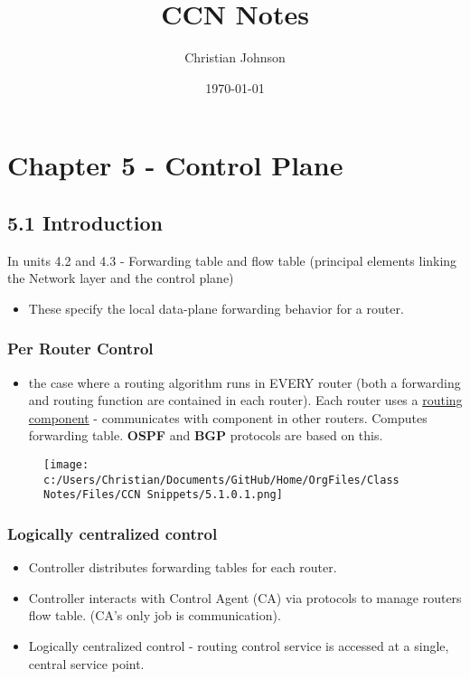 \documentclass[11pt]{article}
\author{Christian Johnson}
\date{\today}
\title{CCN Notes}
\begin{document}
\maketitle
\tableofcontents




\section{Chapter 5 - Control Plane}
\label{sec:org54bc6a9}

\subsection{5.1 Introduction}
\label{sec:org86b6012}

In units 4.2 and 4.3 - Forwarding table and flow table (principal elements linking the Network layer and the control plane)
\begin{itemize}
\item These specify the local data-plane forwarding behavior for a router.
\end{itemize}

\subsubsection{Per Router Control}
\label{sec:org54326b7}
\begin{itemize}
\item the case where a routing algorithm runs in EVERY router (both a forwarding and routing function are contained in each router). Each router uses a \uline{routing component} - communicates with component in other routers. Computes forwarding table. \textbf{OSPF} and \textbf{BGP} protocols are based on this.
\end{itemize}

\begin{figure}[htbp]
\centering
\texttt{[image: c:/Users/Christian/Documents/GitHub/Home/OrgFiles/Class Notes/Files/CCN Snippets/5.1.0.1.png]}
\end{figure}

\subsubsection{Logically centralized control}
\label{sec:orgc38aff5}
\begin{itemize}
\item Controller distributes forwarding tables for each router.
\item Controller interacts with Control Agent (CA) via protocols to manage routers flow table. (CA's only job is communication).
\item Logically centralized control - routing control service is accessed at a single, central service point.
\end{itemize}
\end{document}
